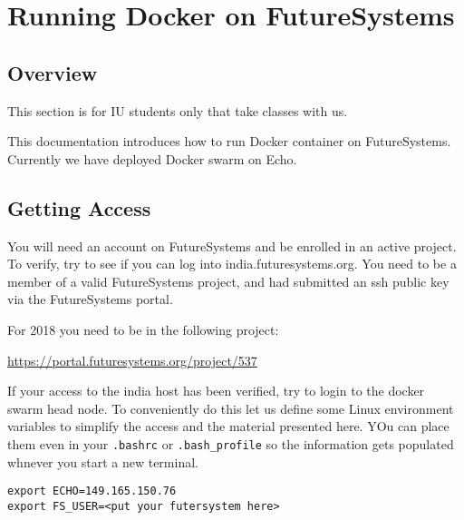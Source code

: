 
\chapter{Running Docker on FutureSystems}\label{S:docker-fg}

\FILENAME

\section{Overview}\label{overview}

\begin{IU}

This section is for IU students only that take classes with us.
\end{IU}

This documentation introduces how to run Docker container on
FutureSystems. Currently we have deployed Docker swarm on Echo.

\section{Getting Access}\label{getting-access}

You will need an account on FutureSystems and be enrolled in an active
project.  To verify, try to see if you can log into
india.futuresystems.org. You need to be a member of a valid
FutureSystems project, and had submitted an ssh public key via the
FutureSystems portal.

\begin{IU}
For 2018 you need to be in the following project:

\url{https://portal.futuresystems.org/project/537}

\end{IU}

If your access to the india host has been verified, try to login to
the docker swarm head node. To conveniently do this let us define some
Linux environment variables to simplify the access and the material
presented here. YOu can place them even in your \verb|.bashrc| or
\verb|.bash_profile| so the information gets populated whnever you start a
new terminal.

\begin{lstlisting}
export ECHO=149.165.150.76
export FS_USER=<put your futersystem here>
\end{lstlisting}


